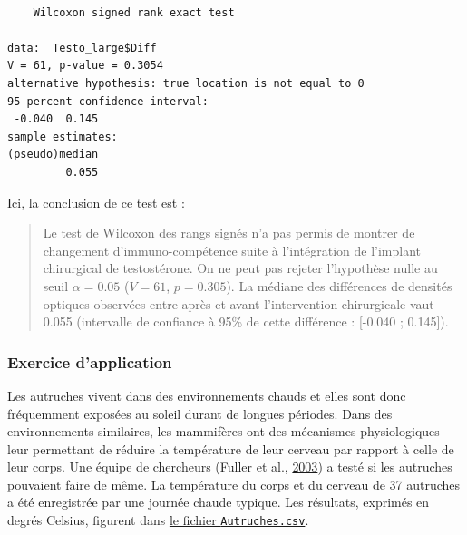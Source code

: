 \documentclass[
  a4paper,
]{article}
\newenvironment{Shaded}{\begin{snugshade}}{\end{snugshade}}
\newcommand{\DataTypeTok}[1]{\textcolor[rgb]{0.00,0.34,0.68}{#1}}
\newcommand{\DecValTok}[1]{\textcolor[rgb]{0.69,0.50,0.00}{#1}}
\newcommand{\KeywordTok}[1]{\textcolor[rgb]{0.12,0.11,0.11}{\textbf{#1}}}
\newcommand{\NormalTok}[1]{\textcolor[rgb]{0.12,0.11,0.11}{#1}}
\newcommand{\OperatorTok}[1]{\textcolor[rgb]{0.12,0.11,0.11}{#1}}
\newcommand{\OtherTok}[1]{\textcolor[rgb]{0.00,0.43,0.16}{#1}}
\begin{document}
\begin{Shaded}
\end{Shaded}

\begin{verbatim}

    Wilcoxon signed rank exact test

data:  Testo_large$Diff
V = 61, p-value = 0.3054
alternative hypothesis: true location is not equal to 0
95 percent confidence interval:
 -0.040  0.145
sample estimates:
(pseudo)median 
         0.055 
\end{verbatim}

Ici, la conclusion de ce test est :

\begin{quote}
Le test de Wilcoxon des rangs signés n'a pas permis de montrer de changement d'immuno-compétence suite à l'intégration de l'implant chirurgical de testostérone. On ne peut pas rejeter l'hypothèse nulle au seuil \(\alpha = 0.05\) (\(V = 61\), \(p = 0.305\)). La médiane des différences de densités optiques observées entre après et avant l'intervention chirurgicale vaut 0.055 (intervalle de confiance à 95\% de cette différence : {[}-0.040 ; 0.145{]}).
\end{quote}

\hypertarget{exercice-dapplication-1}{%
\subsubsection{Exercice d'application}\label{exercice-dapplication-1}}

Les autruches vivent dans des environnements chauds et elles sont donc fréquemment exposées au soleil durant de longues périodes. Dans des environnements similaires, les mammifères ont des mécanismes physiologiques leur permettant de réduire la température de leur cerveau par rapport à celle de leur corps. Une équipe de chercheurs (Fuller et al., \protect\hyperlink{ref-Fuller2003}{2003}) a testé si les autruches pouvaient faire de même. La température du corps et du cerveau de 37 autruches a été enregistrée par une journée chaude typique. Les résultats, exprimés en degrés Celsius, figurent dans \href{https://besibo.github.io/Biometrie3/data/Autruches.csv}{le fichier \texttt{Autruches.csv}}.
\end{document}
